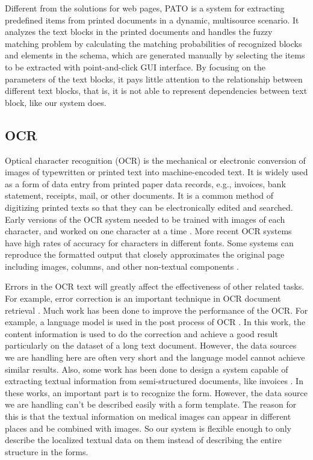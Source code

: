 Different from the solutions for web pages, 
PATO \cite{bartoli2014semisupervised} 
is a system for extracting predefined items from 
printed documents in a dynamic, multisource scenario. It analyzes 
the text blocks in the printed documents and handles the fuzzy matching problem 
by calculating the matching probabilities of recognized blocks and elements in 
the schema, which are generated manually by selecting the 
items to be extracted with point-and-click GUI interface. By focusing on 
the parameters of the text blocks, it pays little attention to the 
relationship between different text blocks, that is, it is not able to
represent dependencies between text block, like our system does.

\subsection{OCR}
Optical character recognition (OCR) is the mechanical or electronic 
conversion of images of typewritten or printed text into machine-encoded 
text. 
It is widely used as a form of data entry from printed paper 
data records, e.g., invoices, bank statement, receipts, mail, or other documents. 
It is a common method 
of digitizing printed texts so that they can be electronically edited and searched. 
Early versions of the OCR system 
needed to be trained with images of each character, and 
worked on one character at a time \cite{mori1992historical}. 
More recent OCR systems have high rates of accuracy for 
characters in different fonts. 
Some systems can reproduce the formatted output that 
closely approximates the original page including images, columns, and 
other non-textual components \cite{smith2007overview}. 

Errors in the OCR text will greatly affect the effectiveness 
of other related tasks. For example, error correction is an important 
technique in OCR document retrieval \cite{darwish2007error} \cite{taghva1996evaluation}.
Much work has been done to improve the performance of the OCR. 
For example, a language model is used in the post process of OCR 
\cite{kolak2003generative}. 
In this work, the content information is used to do the correction 
and achieve a good result particularly on the dataset of a long text 
document. However, the data sources we are handling here are often 
very short and the language model cannot achieve similar results. 
Also, some work has been done to design a system capable of extracting 
textual information from semi-structured documents, like invoices \cite{cesarini1998informys}. 
In these works, an important part is to recognize the form. 
However, the data source we are handling can't be described 
easily with a form template. The reason for this is that the textual information 
on medical images can appear in different places and be combined 
with images. So our system is flexible enough to only describe the localized 
textual data on them instead of describing the entire structure in the forms. 

